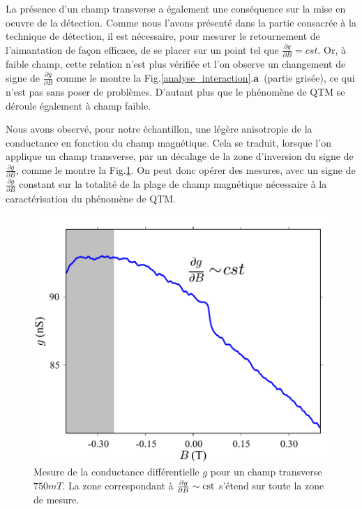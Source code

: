 La présence d'un champ transverse a également une conséquence sur la mise en oeuvre de la détection. Comme nous l'avons présenté dans la partie consacrée à la technique de détection, il est nécessaire, pour mesurer le retournement de l'aimantation de façon efficace, de se placer sur un point tel que $\frac{\partial g}{\partial B} = cst$. Or, à faible champ, cette relation n'est plus vérifiée et l'on observe un changement de signe de $\frac{\partial g}{\partial B}$  comme le montre la Fig.\ref{analyse_interaction}.\textbf{a}~(partie grisée), ce qui n'est pas sans poser de problèmes. D'autant plus que le phénomène de QTM se déroule également à champ faible.

Nous avons observé, pour notre échantillon, une légère anisotropie de la conductance en fonction du champ magnétique. Cela se traduit, lorsque l'on applique un champ transverse, par un décalage de la zone d'inversion du signe de $\frac{\partial g}{\partial B}$, comme le montre la Fig.\ref{TransInfl}. On peut donc opérer des mesures, avec un signe de  $\frac{\partial g}{\partial B}$ constant sur la totalité de la plage de champ magnétique nécessaire à la caractérisation du phénomène de QTM.


\begin{figure}
\parbox{7cm}{
\includegraphics[scale=0.45]{Resultats/TransInfl/TransInfl.pdf} 
}
\parbox{6.5cm}{\caption{Mesure de la conductance différentielle $g$ pour un champ transverse $750mT$. La zone correspondant à $\frac{\partial g}{\partial B} \sim \rm{cst}$ s'étend sur toute la zone de mesure.}
\label{TransInfl}
}
\end{figure}




